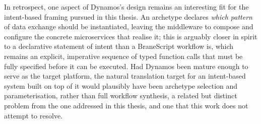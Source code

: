 In retrospect, one aspect of Dynamos's design remains an interesting fit for
the intent-based framing pursued in this thesis. An archetype declares
\emph{which pattern} of data exchange should be instantiated, leaving the
middleware to compose and configure the concrete microservices that realise
it; this is arguably closer in spirit to a declarative statement of intent
than a BraneScript workflow is, which remains an explicit, imperative sequence
of typed function calls that must be fully specified before it can be
executed. Had Dynamos been mature enough to serve as the target platform, the
natural translation target for an intent-based system built on top of it
would plausibly have been archetype selection and parameterisation, rather
than full workflow synthesis, a related but distinct problem from the one
addressed in this thesis, and one that this work does not attempt to resolve.



